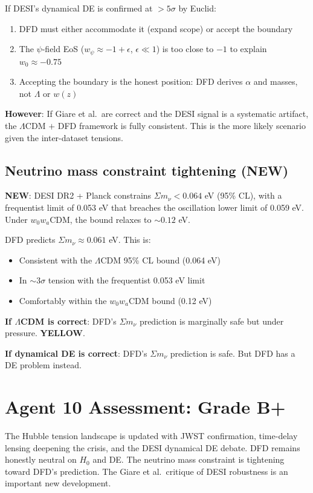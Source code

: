 \documentclass[11pt,a4paper]{article}
\newcommand{\YELLOW}{\textcolor{dfdyellow}{\textbf{YELLOW}}}
\newcommand{\NEW}{\textcolor{dfdblue}{\textbf{NEW}}}
\begin{document}
If DESI's dynamical DE is confirmed at $> 5\sigma$ by Euclid:
\begin{enumerate}
\item DFD must either accommodate it (expand scope) or accept the boundary
\item The $\psi$-field EoS ($w_\psi \approx -1 + \epsilon$, $\epsilon \ll 1$) is too close to $-1$ to explain $w_0 \approx -0.75$
\item Accepting the boundary is the honest position: DFD derives $\alpha$ and masses, not $\Lambda$ or $w(z)$
\end{enumerate}

\textbf{However}: If Giare et al.\ are correct and the DESI signal is a systematic artifact, the $\Lambda$CDM $+$ DFD framework is fully consistent. This is the more likely scenario given the inter-dataset tensions.

\subsection{Neutrino mass constraint tightening (NEW)}

\textbf{\NEW}: DESI DR2 + Planck constrains $\Sigma m_\nu < 0.064$ eV (95\% CL), with a frequentist limit of 0.053 eV that breaches the oscillation lower limit of 0.059 eV. Under $w_0 w_a$CDM, the bound relaxes to $\sim 0.12$ eV.

DFD predicts $\Sigma m_\nu \approx 0.061$ eV. This is:
\begin{itemize}
\item Consistent with the $\Lambda$CDM 95\% CL bound (0.064 eV)
\item In $\sim 3\sigma$ tension with the frequentist 0.053 eV limit
\item Comfortably within the $w_0 w_a$CDM bound (0.12 eV)
\end{itemize}

\textbf{If $\Lambda$CDM is correct}: DFD's $\Sigma m_\nu$ prediction is marginally safe but under pressure. \YELLOW{}.

\textbf{If dynamical DE is correct}: DFD's $\Sigma m_\nu$ prediction is safe. But DFD has a DE problem instead.

\section{Agent 10 Assessment: Grade B+}

The Hubble tension landscape is updated with JWST confirmation, time-delay lensing deepening the crisis, and the DESI dynamical DE debate. DFD remains honestly neutral on $H_0$ and DE. The neutrino mass constraint is tightening toward DFD's prediction. The Giare et al.\ critique of DESI robustness is an important new development.
\end{document}
